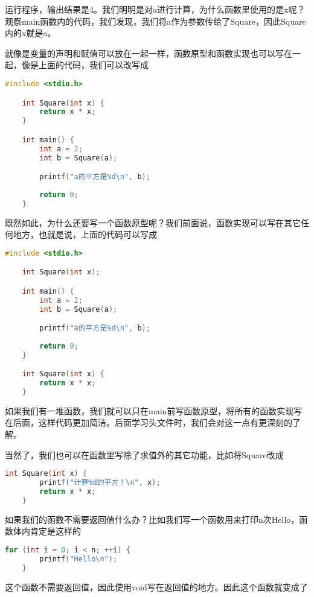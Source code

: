 运行程序，输出结果是4。我们明明是对a进行计算，为什么函数里使用的是x呢？观察main函数内的代码，我们发现，我们将a作为参数传给了Square，因此Square内的x就是a。

就像是变量的声明和赋值可以放在一起一样，函数原型和函数实现也可以写在一起，像是上面的代码，我们可以改写成

\begin{lstlisting}[language=C]
    #include <stdio.h>

    int Square(int x) {
        return x * x;
    }

    int main() {
        int a = 2;
        int b = Square(a);

        printf("a的平方是%d\n", b);
        
        return 0;
    }
\end{lstlisting}

既然如此，为什么还要写一个函数原型呢？我们前面说，函数实现可以写在其它任何地方，也就是说，上面的代码可以写成

\begin{lstlisting}[language=C]
    #include <stdio.h>

    int Square(int x);

    int main() {
        int a = 2;
        int b = Square(a);

        printf("a的平方是%d\n", b);
        
        return 0;
    }

    int Square(int x) {
        return x * x;
    }
\end{lstlisting}

如果我们有一堆函数，我们就可以只在main前写函数原型，将所有的函数实现写在后面，这样代码更加简洁。后面学习头文件时，我们会对这一点有更深刻的了解。

当然了，我们也可以在函数里写除了求值外的其它功能，比如将Square改成

\begin{lstlisting}[language=C]
    int Square(int x) {
        printf("计算%d的平方！\n", x);
        return x * x;
    }
\end{lstlisting}

如果我们的函数不需要返回值什么办？比如我们写一个函数用来打印n次Hello，函数体内肯定是这样的

\begin{lstlisting}[language=C]
    for (int i = 0; i < n; ++i) {
        printf("Hello\n");
    }
\end{lstlisting}

这个函数不需要返回值，因此使用void写在返回值的地方。因此这个函数就变成了

